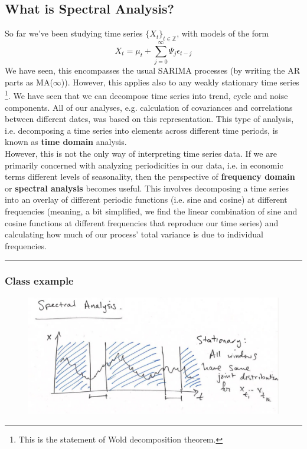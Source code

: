 \subsection{What is Spectral Analysis?}
So far we've been studying time series $\{X_t\}_{t\in \mathbb{Z}}$, with models of the form \[X_t=\mu_t +\sum_{j=0}^\infty \Psi_j \epsilon_{t-j} \]
We have seen, this encompasses the usual SARIMA processes (by writing the AR parts as MA($\infty$)). However, this applies also to any weakly stationary time series \footnote{This is the statement of Wold decomposition theorem.}. We have seen that we can decompose time series into trend, cycle and noise components. All of our analyses, e.g. calculation of covariances and correlations between different dates, was based on this representation. This type of analysis, i.e. decomposing a time series into elements across different time periods, is known as \textbf{time domain} analysis.\\

However, this is not the only way of interpreting time series data. If we are primarily concerned with analyzing periodicities in our data, i.e. in economic terms different levels of seasonality, then the perspective of \textbf{frequency domain} or \textbf{spectral analysis} becomes useful. This involves decomposing a time series into an overlay of different periodic functions (i.e. sine and cosine) at different frequencies (meaning, a bit simplified, we find the linear combination of sine and cosine functions at different frequencies that reproduce our time series) and calculating how much of our process' total variance is due to individual frequencies.\\

\noindent
\rule{\linewidth}{0.4pt}

\subsubsection{Class example}

\begin{figure}[H]
\includegraphics[scale=0.3]{images/Screenshot 2024-04-29 at 08.36.41.jpg}
\centering
\end{figure}


